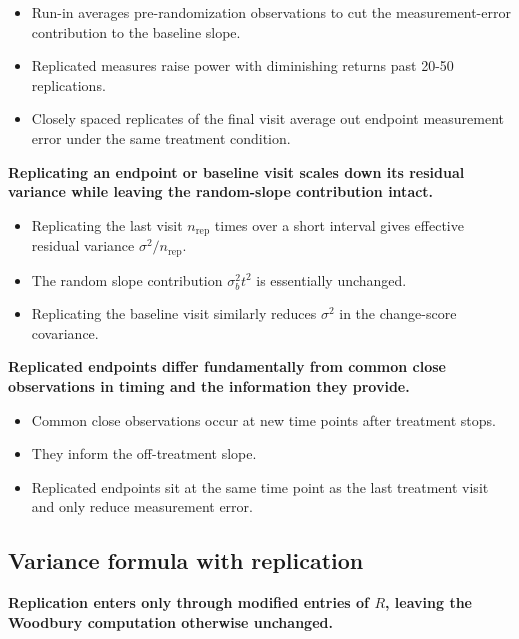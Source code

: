 \documentclass[
  11pt,
]{article}
\begin{document}
\begin{itemize}\setlength{\itemsep}{2pt}\setlength{\parskip}{0pt}
\item Run-in averages pre-randomization observations to cut the measurement-error contribution to the baseline slope.
\item Replicated measures raise power with diminishing returns past 20-50 replications.
\item Closely spaced replicates of the final visit average out endpoint measurement error under the same treatment condition.
\end{itemize}

\textbf{Replicating an endpoint or baseline visit scales down its residual variance while leaving the random-slope contribution intact.}

\begin{itemize}\setlength{\itemsep}{2pt}\setlength{\parskip}{0pt}
\item Replicating the last visit $n_{\text{rep}}$ times over a short interval gives effective residual variance $\sigma^2 / n_{\text{rep}}$.
\item The random slope contribution $\sigma_b^2 t^2$ is essentially unchanged.
\item Replicating the baseline visit similarly reduces $\sigma^2$ in the change-score covariance.
\end{itemize}

\textbf{Replicated endpoints differ fundamentally from common close observations in timing and the information they provide.}

\begin{itemize}\setlength{\itemsep}{2pt}\setlength{\parskip}{0pt}
\item Common close observations occur at new time points after treatment stops.
\item They inform the off-treatment slope.
\item Replicated endpoints sit at the same time point as the last treatment visit and only reduce measurement error.
\end{itemize}

\subsection{Variance formula with replication}\label{variance-formula-with-replication}

\textbf{Replication enters only through modified entries of $R$, leaving the Woodbury computation otherwise unchanged.}
\end{document}
